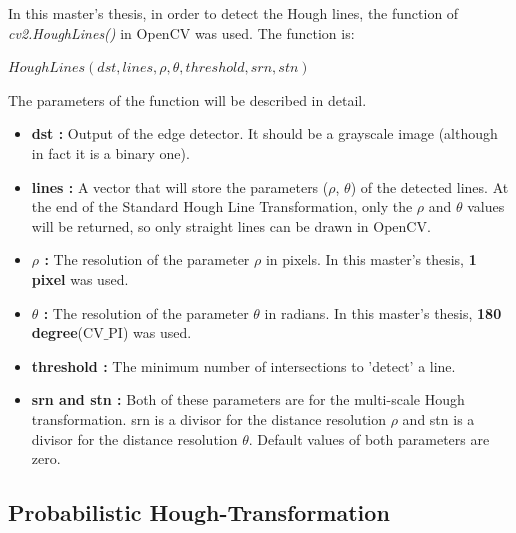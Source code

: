 In this master's thesis, in order to detect the Hough lines, the function of \textit{cv2.HoughLines()} in OpenCV was used. The function is:

  \begin{center}
  
$HoughLines(dst, lines, \rho, \theta, threshold, srn, stn )  $

  \end{center}

The parameters of the function will be described in detail.\cite{Standard_Hough_Transformation2}
 
\begin{itemize}

\item \textbf{dst : }Output of the edge detector. It should be a grayscale image (although in fact it is a binary one).
 
\item \textbf{lines : }A vector that will store the parameters ($ \rho $, $ \theta $) of the detected lines. At the end of the Standard Hough Line Transformation, only the $ \rho $ and $ \theta $ values will be returned, so only straight lines can be drawn in OpenCV.

\item \textbf{$ \rho $ : }The resolution of the parameter $ \rho $ in pixels. In this master's thesis, \textbf{1 pixel} was used.

\item \textbf{$ \theta $ : }The resolution of the parameter $ \theta $ in radians. In this master's thesis, \textbf{180 degree}(CV$ \_ $PI) was used.

\item \textbf{threshold : }The minimum number of intersections to 'detect' a line.

\item \textbf{srn and stn : }Both of these parameters are for the multi-scale Hough transformation. srn is a divisor for the distance resolution $ \rho $ and stn is a divisor for the distance resolution $ \theta $. Default values of both parameters are zero.

\end{itemize}

%
\subsection{Probabilistic Hough-Transformation}\label{sec:Probabilistic Hough-Transformation}
%

